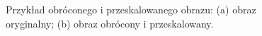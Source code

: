 \begin{figure}[!ht]
 \begin{center}
 \end{center}
 \caption{
  Przykład obróconego i przeskalowanego obrazu:
  (a) obraz oryginalny;
  (b) obraz obrócony i przeskalowany.
 }
 \label{fig:rotation_and_scale}
\end{figure}